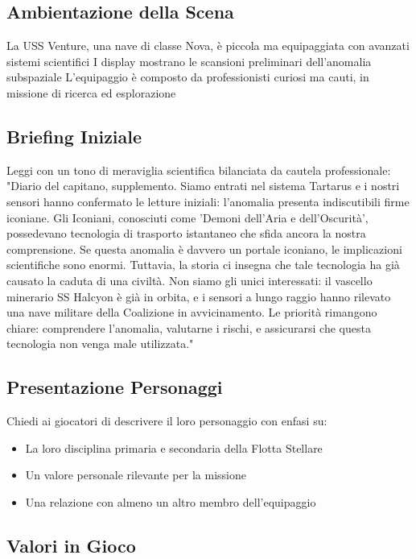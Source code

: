\documentclass[letterpaper,twocolumn,openany,nodeprecatedcode]{dndbook}
\begin{document}
\subsection{Ambientazione della Scena}

La USS Venture, una nave di classe Nova, è piccola ma equipaggiata con avanzati sistemi scientifici
I display mostrano le scansioni preliminari dell'anomalia subspaziale
L'equipaggio è composto da professionisti curiosi ma cauti, in missione di ricerca ed esplorazione

\subsection{Briefing Iniziale}
Leggi con un tono di meraviglia scientifica bilanciata da cautela professionale:
"Diario del capitano, supplemento. Siamo entrati nel sistema Tartarus e i nostri sensori hanno confermato le letture iniziali: l'anomalia presenta indiscutibili firme iconiane. Gli Iconiani, conosciuti come 'Demoni dell'Aria e dell'Oscurità', possedevano tecnologia di trasporto istantaneo che sfida ancora la nostra comprensione. Se questa anomalia è davvero un portale iconiano, le implicazioni scientifiche sono enormi. Tuttavia, la storia ci insegna che tale tecnologia ha già causato la caduta di una civiltà. Non siamo gli unici interessati: il vascello minerario SS Halcyon è già in orbita, e i sensori a lungo raggio hanno rilevato una nave militare della Coalizione in avvicinamento. Le priorità rimangono chiare: comprendere l'anomalia, valutarne i rischi, e assicurarsi che questa tecnologia non venga male utilizzata."
\subsection{Presentazione Personaggi}

Chiedi ai giocatori di descrivere il loro personaggio con enfasi su:

\begin{itemize}
    \item La loro disciplina primaria e secondaria della Flotta Stellare
    \item Un valore personale rilevante per la missione
    \item Una relazione con almeno un altro membro dell'equipaggio
\end{itemize}



\subsection{Valori in Gioco}
\end{document}
